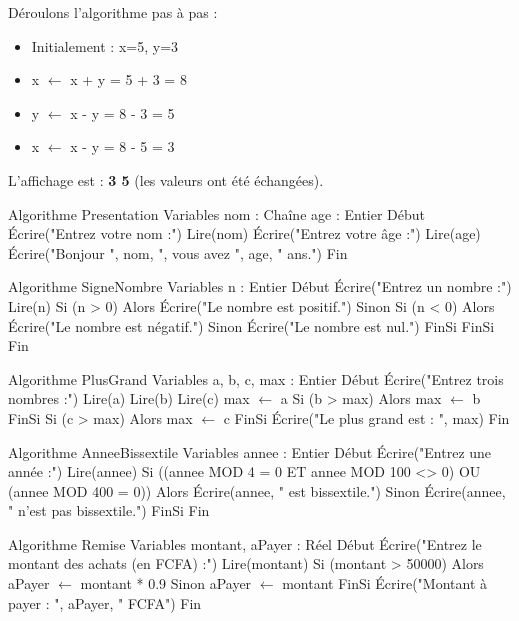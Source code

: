 Déroulons l'algorithme pas à pas :
\begin{itemize}
    \item Initialement : x=5, y=3
    \item x $\leftarrow$ x + y = 5 + 3 = 8
    \item y $\leftarrow$ x - y = 8 - 3 = 5
    \item x $\leftarrow$ x - y = 8 - 5 = 3
\end{itemize}
L'affichage est : \textbf{3 5} (les valeurs ont été échangées).

\begin{algo}
Algorithme Presentation
Variables
    nom : Chaîne
    age : Entier
Début
    Écrire("Entrez votre nom :")
    Lire(nom)
    Écrire("Entrez votre âge :")
    Lire(age)
    Écrire("Bonjour ", nom, ", vous avez ", age, " ans.")
Fin
\end{algo}

\begin{algo}
Algorithme SigneNombre
Variables
    n : Entier
Début
    Écrire("Entrez un nombre :")
    Lire(n)
    Si (n > 0) Alors
        Écrire("Le nombre est positif.")
    Sinon
        Si (n < 0) Alors
            Écrire("Le nombre est négatif.")
        Sinon
            Écrire("Le nombre est nul.")
        FinSi
    FinSi
Fin
\end{algo}

\begin{algo}
Algorithme PlusGrand
Variables
    a, b, c, max : Entier
Début
    Écrire("Entrez trois nombres :")
    Lire(a)
    Lire(b)
    Lire(c)
    max $\leftarrow$ a
    Si (b > max) Alors
        max $\leftarrow$ b
    FinSi
    Si (c > max) Alors
        max $\leftarrow$ c
    FinSi
    Écrire("Le plus grand est : ", max)
Fin
\end{algo}

\begin{algo}
Algorithme AnneeBissextile
Variables
    annee : Entier
Début
    Écrire("Entrez une année :")
    Lire(annee)
    Si ((annee MOD 4 = 0 ET annee MOD 100 <> 0) OU (annee MOD 400 = 0)) Alors
        Écrire(annee, " est bissextile.")
    Sinon
        Écrire(annee, " n'est pas bissextile.")
    FinSi
Fin
\end{algo}

\begin{algo}
Algorithme Remise
Variables
    montant, aPayer : Réel
Début
    Écrire("Entrez le montant des achats (en FCFA) :")
    Lire(montant)
    Si (montant > 50000) Alors
        aPayer $\leftarrow$ montant * 0.9
    Sinon
        aPayer $\leftarrow$ montant
    FinSi
    Écrire("Montant à payer : ", aPayer, " FCFA")
Fin
\end{algo}

